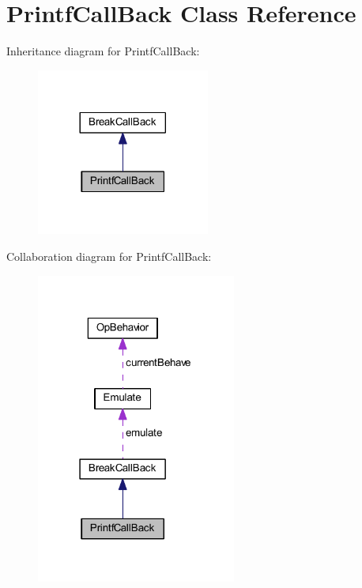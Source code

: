 \hypertarget{class_printf_call_back}{}\section{Printf\+Call\+Back Class Reference}
\label{class_printf_call_back}


Inheritance diagram for Printf\+Call\+Back\+:
\nopagebreak
\begin{figure}[H]
\begin{center}
\leavevmode
\includegraphics[width=161pt]{class_printf_call_back__inherit__graph}
\end{center}
\end{figure}


Collaboration diagram for Printf\+Call\+Back\+:
\nopagebreak
\begin{figure}[H]
\begin{center}
\leavevmode
\includegraphics[width=186pt]{class_printf_call_back__coll__graph}
\end{center}
\end{figure}
